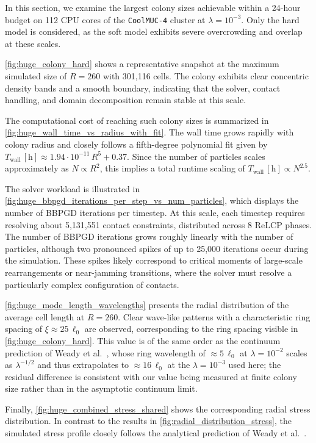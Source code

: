 \documentclass[a4paper,fleqn]{cas-dc}
\begin{document}
In this section, we examine the largest colony sizes achievable within a 24-hour budget on 112 CPU cores of the \texttt{CoolMUC-4} cluster at $\lambda = 10^{-3}$. Only the hard model is considered, as the soft model exhibits severe overcrowding and overlap at these scales.

\autoref{fig:huge_colony_hard} shows a representative snapshot at the maximum simulated size of $R = 260$ with 301{,}116 cells. The colony exhibits clear concentric density bands and a smooth boundary, indicating that the solver, contact handling, and domain decomposition remain stable at this scale.

The computational cost of reaching such colony sizes is summarized in \autoref{fig:huge_wall_time_vs_radius_with_fit}. The wall time grows rapidly with colony radius and closely follows a fifth-degree polynomial fit given by $T_\text{wall}\,[\mathrm{h}] \approx 1.94\cdot10^{-11}\,R^{5} + 0.37$. Since the number of particles scales approximately as $N \propto R^{2}$, this implies a total runtime scaling of $T_\text{wall}\,[\mathrm{h}] \propto N^{2.5}$.

The solver workload is illustrated in \autoref{fig:huge_bbpgd_iterations_per_step_vs_num_particles}, which displays the number of BBPGD iterations per timestep. At this scale, each timestep requires resolving about 5{,}131{,}551 contact constraints, distributed across 8 ReLCP phases. The number of BBPGD iterations grows roughly linearly with the number of particles, although two pronounced spikes of up to 25{,}000 iterations occur during the simulation. These spikes likely correspond to critical moments of large-scale rearrangements or near-jamming transitions, where the solver must resolve a particularly complex configuration of contacts.

\autoref{fig:huge_mode_length_wavelengths} presents the radial distribution of the average cell length at $R = 260$. Clear wave-like patterns with a characteristic ring spacing of $\xi \approx 25\,\ell_0$ are observed, corresponding to the ring spacing visible in \autoref{fig:huge_colony_hard}. This value is of the same order as the continuum prediction of Weady et al.~\cite{Weady2024}, whose ring wavelength of $\approx 5\,\ell_0$ at $\lambda = 10^{-2}$ scales as $\lambda^{-1/2}$ and thus extrapolates to $\approx 16\,\ell_0$ at the $\lambda = 10^{-3}$ used here; the residual difference is consistent with our value being measured at finite colony size rather than in the asymptotic continuum limit.

Finally, \autoref{fig:huge_combined_stress_shared} shows the corresponding radial stress distribution. In contrast to the results in \autoref{fig:radial_distribution_stress}, the simulated stress profile closely follows the analytical prediction of Weady et al.~\cite{Weady2024SM}.
\end{document}
